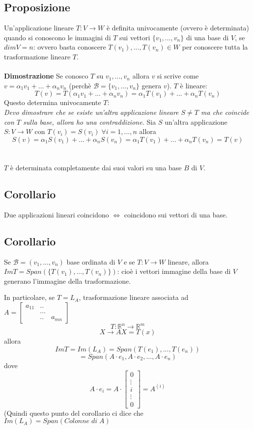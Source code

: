 \subsection{Proposizione}
Un'applicazione lineare $T:V\rightarrow W$ è definita univocamente (ovvero è determinata) quando si conoscono le immagini di $T$ sui vettori $\{v_1,...,v_n\}$ di una base di $V$, se $dimV=n$: ovvero basta conoscere
\(T(v_1),...,T(v_n)\in W\) per conoscere tutta la trasformazione lineare $T$.
\\
\\\textbf{Dimostrazione}
Se conosco $T$ su $v_1,...,v_n$ allora $v$ si scrive come $v=\alpha_1v_1+...+\alpha_nv_n$ (perchè $\mathcal{B}=\{v_1,...,v_n\}$ genera $v$).
$T$ è lineare:
\[T(v)=T(\alpha_1v_1+...+\alpha_nv_n)=\alpha_1T(v_1)+...+\alpha_nT(v_n)\]
Questo determina univocamente $T$:
\\\textit{Devo dimostrare che se esiste un'altra applicazione lineare $S\neq T$ ma che coincide con $T$ sulla base, allora ho una contraddizione.}
Sia $S$ un'altra applicazione $S:V\rightarrow W$ con $T(v_i)=S(v_i)\;\forall i=1,...,n$ allora
\[S(v)=\alpha_1S(v_1)+...+\alpha_nS(v_n)=\alpha_1T(v_1)+...+\alpha_nT(v_n)=T(v)\]
\\
\\$T$ è determinata completamente dai suoi valori su una base $B$ di $V$.

\subsection{Corollario} 
Due applicazioni lineari coincidono $\Leftrightarrow$ coincidono sui vettori di una base.

\subsection{Corollario}
Se $\mathcal{B}=(v_1,...,v_n)$ base ordinata di $V$ e se $T:V\rightarrow W$ lineare, allora $ImT=Span(\{T(v_1),...,T(v_n)\})$: cioè i vettori immagine della base di $V$ generano l'immagine della trasformazione.

In particolare, se $T=L_A$, trasformazione lineare associata ad $A=\begin{bmatrix}a_{11}&..&\\&...&\\&..&a_{mn}\end{bmatrix}$ 
\[T:\mathbb{R}^n\rightarrow\mathbb{R}^m\]
\[X\rightarrow AX=T(x)\]
allora
\[ImT=Im(L_A)=Span(T(e_1),...,T(e_n))\]
\[=Span(A\cdot e_1,A\cdot e_2,...,A\cdot e_n)\]
dove
\[A\cdot e_i=A\cdot\begin{bmatrix}0\\\vdots\\i\\\vdots\\0\end{bmatrix}=A^{(i)}\]
(Quindi questo punto del corollario ci dice che $Im(L_A)=Span(Colonne\;di\;A)$

